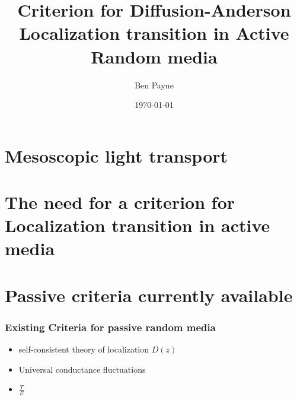 \documentclass[]{beamer}
\title{Criterion for Diffusion-Anderson Localization transition in Active Random media}    %
\author{Ben Payne}
\institute{University of Missouri-Rolla}
\date{\today}                    %
\begin{document}
\begin{frame}
  \titlepage
\end{frame}

\section[Outline]{}

\begin{frame}
  \tableofcontents
\end{frame}


\section{Mesoscopic light transport}

\begin{frame}

\end{frame}

\section{The need for a criterion for Localization transition in active media}

\begin{frame}

\end{frame}

\section{Passive criteria currently available}

\begin{frame}
  \frametitle{Existing Criteria for passive random media}   %

  \begin{itemize}
  \item self-consistent theory of localization $D(z)$
  \item Universal conductance fluctuations
  \item $\frac{T}{E}$
  \end{itemize}
\end{frame}
\end{document}
